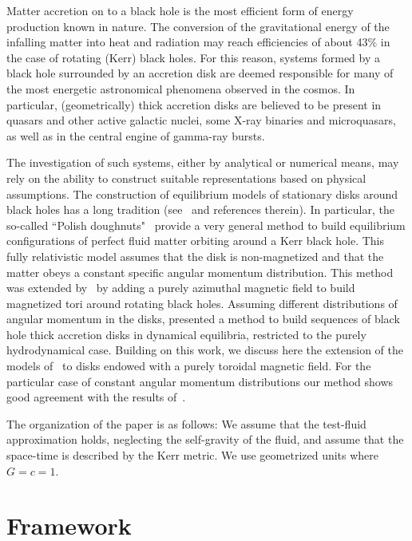 \documentclass{aa}
\begin{document}
Matter accretion on to a black hole is the most efficient form of energy production known in nature. The conversion of the
gravitational energy of the infalling matter into heat and radiation may reach efficiencies
of about 43\% in the case of rotating (Kerr) black holes. For this reason, systems formed 
by a black hole surrounded by an accretion disk are deemed responsible for many of the most energetic astronomical phenomena observed in the cosmos.
In particular, (geometrically) thick accretion disks are believed to be present in quasars and other active galactic nuclei, some 
X-ray binaries and microquasars, as well as in the central engine of gamma-ray bursts.

The investigation of such systems, either by analytical or numerical means, may rely on the ability to construct suitable 
representations based on physical assumptions. The construction of equilibrium models of stationary disks around black holes has a long tradition (see~\cite{Abramowicz:2013} and references therein). In particular, the so-called ``Polish doughnuts"~\citep{Abramowicz:1978,Kozlowski:1978} provide a  very general method to build equilibrium configurations of perfect fluid matter  
 orbiting around a Kerr black hole. This fully relativistic model assumes that the disk is non-magnetized and that the matter obeys a  constant specific angular momentum distribution. This method was extended by~\cite{Komissarov:2006}  by adding a purely azimuthal magnetic 
 field to build magnetized tori around rotating black holes. Assuming different distributions of angular momentum in the disks, \citet{Qian:2009} presented a method to build sequences of black hole thick accretion disks in dynamical equilibria, restricted to the purely hydrodynamical case. Building on this work, we discuss here the extension of the
models of~\citet{Qian:2009} to disks endowed with a purely toroidal magnetic field. For the particular case of constant angular momentum distributions our method shows good agreement with the results of~\citet{Komissarov:2006}.

The organization of the paper is as follows:
We assume that the test-fluid approximation holds, neglecting the self-gravity of the fluid, and assume that the space-time is described by the Kerr metric. We use geometrized units where $G = c = 1$.

\section{Framework}
\end{document}
